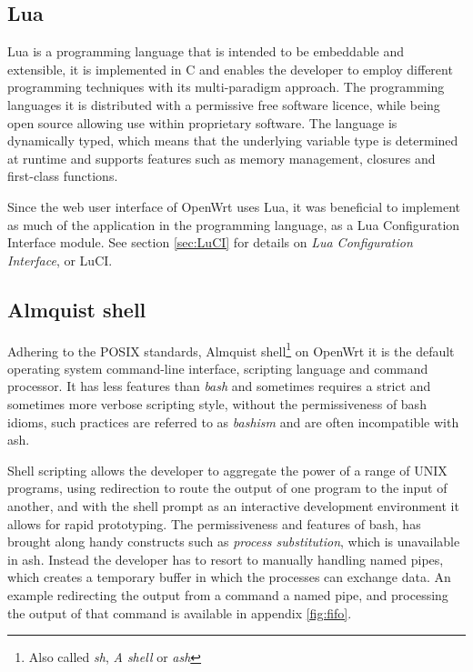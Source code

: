 \documentclass[g5paper,11pt]{kth-bcs}
\begin{document}
\subsection{Lua}
Lua is a programming language that is intended to be embeddable and extensible, it is implemented in C and enables the developer to employ different programming techniques with its multi-paradigm approach.
The programming languages it is distributed with a permissive free software licence\cite{mit-license}, while being open source allowing use within proprietary software.
The language is dynamically typed, which means that the underlying variable type is determined at runtime and supports features such as memory management, closures and first-class functions.\nocite{ierusalimschy2006programming}

Since the web user interface of OpenWrt uses Lua, it was beneficial to implement as much of the application in the programming language, as a Lua Configuration Interface module.
See section \ref{sec:LuCI} for details on \emph{Lua Configuration Interface}, or LuCI.

\subsection{Almquist shell}
Adhering to the POSIX standards, Almquist shell\footnote{Also called \emph{sh}, \emph{A shell} or \emph{ash}} on OpenWrt it is the default operating system command-line interface, scripting language and command processor.
It has less features than \emph{bash} and sometimes requires a strict and sometimes more verbose scripting style, without the permissiveness of bash idioms, such practices are referred to as \emph{bashism} and are often incompatible with ash.

Shell scripting allows the developer to aggregate the power of a range of UNIX programs, using redirection to route the output of one program to the input of another, and with the shell prompt as an interactive development environment it allows for rapid prototyping.
The permissiveness and features of bash, has brought along handy constructs such as \emph{process substitution}, which is unavailable in ash.
Instead the developer has to resort to manually handling named pipes, which creates a temporary buffer in which the processes can exchange data.
An example redirecting the output from a command a named pipe, and processing the output of that command is available in appendix \ref{fig:fifo}.
\end{document}
